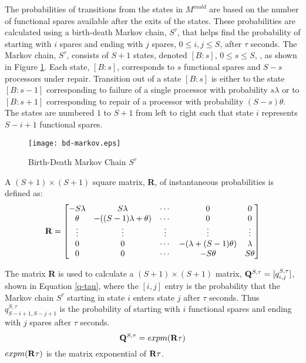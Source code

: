 \documentclass[conference,10pt]{IEEEtran}
\begin{document}
The probabilities of transitions from the states in $M^{mold}$ are based
on the number of functional spares available after the exits of the
states. These probabilities are calculated using a  birth-death Markov
chain,  $S^{\tau}$, that helps find the probability of starting
with $i$ spares and ending with $j$ spares, $0\leq i,j\leq S$, after
$\tau$ seconds. The Markov chain, $S^{\tau}$, consists of $S+1$
states, denoted $[B:s]$, $0\leq s\leq S$,
, as shown in Figure
\ref{bd-markov}.
Each state, $[B:s]$, corresponds to $s$ functional
spares and $S-s$ processors under repair. Transition out of a state
$[B:s]$ is either to the state $[B:s-1]$ corresponding to failure of a
single processor with probability $s\lambda$ or to $[B:s+1]$ corresponding
to repair of a processor with probability $(S-s)\theta$. The states
are numbered $1$ to $S+1$ from left to right such that state $i$
represents $S-i+1$ functional spares.
\begin{figure}
\centering
\texttt{[image: bd-markov.eps]}
\caption{Birth-Death Markov Chain $S^{\tau}$}
\label{bd-markov}
\end{figure}

A $(S+1)\times (S+1)$ square matrix, {\bf R}, of instantaneous
probabilities is defined as:
\begin{equation}
{\bf R} = 
\begin{bmatrix}
-S\lambda & S\lambda & \cdots & 0 & 0 \\
\theta & -((S-1)\lambda + \theta) & \cdots & 0 & 0 \\
\vdots & \vdots & \vdots & \vdots & \vdots \\
0 & 0 & \cdots & -(\lambda + (S-1)\theta ) & \lambda \\
0 & 0 & \cdots & -S\theta & S\theta \\
\end{bmatrix}
\label{Rmatrix}
\end{equation}

The matrix {\bf R} is used to calculate a $(S+1)\times (S+1)$ matrix,
${\bf Q}^{S,\tau} = [q_{i,j}^{S,\tau}]$, shown in Equation
\ref{q-tau}, where the $[i,j]$ entry is the probability
that the Markov chain $S^{\tau}$ starting in state $i$ enters state
$j$ after $\tau$ seconds. Thus $q_{S-i+1,S-j+1}^{S,\tau}$ is the
probability of starting with $i$ functional spares and ending with $j$
spares after $\tau$ seconds.
\begin{equation}
{\bf Q}^{S,\tau} = expm({\bf R}\tau )
\label{q-tau}
\end{equation}
$expm({\bf R}\tau )$ is the matrix exponential of ${\bf R}\tau$.
\end{document}
